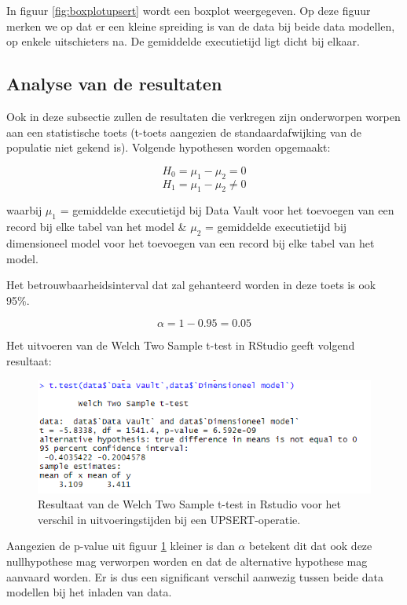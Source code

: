 In figuur \ref{fig:boxplotupsert} wordt een boxplot weergegeven. Op deze figuur merken we op dat er een kleine spreiding is van de data bij beide data modellen, op enkele uitschieters na. De gemiddelde executietijd ligt dicht bij elkaar.

\subsection{Analyse van de resultaten}
Ook in deze subsectie zullen de resultaten die verkregen zijn onderworpen worpen aan een statistische toets (t-toets aangezien de standaardafwijking van de populatie niet gekend is). Volgende hypothesen worden opgemaakt:

\[
H_0 = \mu_1 - \mu_2 = 0
\]
\[
H_1 = \mu_1 - \mu_2 \neq 0
\]

waarbij
$\mu_1$ = gemiddelde executietijd bij Data Vault voor het toevoegen van een record bij elke tabel van het model \&
$\mu_2$ = gemiddelde executietijd bij dimensioneel model voor het toevoegen van een record bij elke tabel van het model.

Het betrouwbaarheidsinterval dat zal gehanteerd worden in deze toets is ook 95\%.

\[
\alpha = 1 - 0.95 = 0.05
\]


Het uitvoeren van de Welch Two Sample t-test in RStudio geeft volgend resultaat:

\begin{figure}[H]
	\centering
	\includegraphics[scale=0.7]{../images/Ttestupsert.png}
	\caption{Resultaat van de Welch Two Sample t-test in Rstudio voor het verschil in uitvoeringstijden bij een UPSERT-operatie. }
	\label{fig:ttestups}
\end{figure}

Aangezien de p-value uit figuur \ref{fig:ttestups} kleiner is dan $\alpha$ betekent dit dat ook deze nullhypothese mag verworpen worden en dat de alternative hypothese mag aanvaard worden. Er is dus een significant verschil aanwezig tussen beide data modellen bij het inladen van data.

